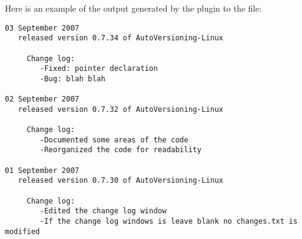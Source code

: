 Here is an example of the output generated by the plugin to the  file:

\begin{lstlisting}
03 September 2007
   released version 0.7.34 of AutoVersioning-Linux

     Change log:
        -Fixed: pointer declaration
        -Bug: blah blah

02 September 2007
   released version 0.7.32 of AutoVersioning-Linux

     Change log:
        -Documented some areas of the code
        -Reorganized the code for readability

01 September 2007
   released version 0.7.30 of AutoVersioning-Linux

     Change log:
        -Edited the change log window
        -If the change log windows is leave blank no changes.txt is modified
\end{lstlisting}
